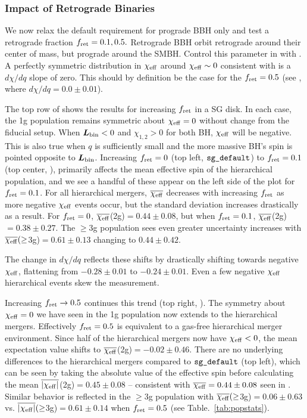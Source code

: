 \subsubsection{Impact of Retrograde Binaries}
\label{sec:retro-results}
We now relax the default requirement for prograde BBH only and test a retrograde fraction $\fret=0.1,0.5.$ Retrograde BBH orbit retrograde around their center of mass, but prograde around the SMBH.
Control this parameter in \mcfacts with .
A perfectly symmetric  distribution in $\Xeff$ around $\Xeff \sim 0$ consistent with is a $d\chi/dq$ slope of zero.
This should by definition be the case for the $\fret=0.5$ (see , where $d\chi/dq=0.0\pm0.01$).

The top row of  shows the results for increasing $\fret$ in a SG disk.
In each case, the 1g population remains symmetric about $\Xeff=0$ without change from the fiducial setup.
When $\vec{L}_{\rm bin}<0$ and $\chi_{1,2}>0$ for both BH, $\Xeff$ will be negative.
This is also true when $q$ is sufficiently small and the more massive BH's spin is pointed opposite to $\vec{L}_{\rm bin}$.
Increasing  $\fret=0$ (top left, $\sgdefault$) to $\fret=0.1$ (top center, ), primarily affects the mean effective spin of the hierarchical population, and we see a handful of these appear on the left side of the plot for $\fret=0.1$.
For all hierarchical mergers, $\barXeff$ decreases with increasing $\fret$ as more negative $\Xeff$ events occur, but the standard deviation increases drastically as a result.
For $\fret=0$, $\barXeff$(2g)$=0.44\pm0.08$, but when $\fret=0.1$, $\barXeff$(2g)$=0.38\pm0.27$.
The $\geq$3g population sees even greater uncertainty increases with $\barXeff(\geq$3g)$=0.61\pm0.13$ changing to $0.44\pm0.42$.

The change in $d\chi/dq$ reflects these shifts by drastically shifting towards negative $\Xeff$, flattening from $-0.28\pm0.01$ to $-0.24\pm0.01$.
Even a few negative $\Xeff$ hierarchical events skew the measurement.

Increasing $\fret \rightarrow 0.5$ continues this trend (top right, ).
The symmetry about $\Xeff=0$ we have seen in the 1g population now extends to the hierarchical mergers.
Effectively $\fret=0.5$ is equivalent to a gas-free hierarchical merger environment.
Since half of the hierarchical mergers now have $\Xeff<0$, the mean expectation value shifts to $\barXeff$(2g)$=-0.02\pm0.46$.
There are no underlying differences to the hierarchical mergers compared to $\sgdefault$ (top left), which can be seen by taking the absolute value of the effective spin before calculating the mean $\overline{|\Xeff|}$(2g)$=0.45\pm0.08$ -- consistent with $\barXeff=0.44\pm0.08$ seen in \sgdefault.
Similar behavior is reflected in the $\geq$3g population with $\barXeff(\geq$3g)$=0.06\pm0.63$ vs.
$\overline{|\Xeff|}(\geq$3g)$=0.61\pm0.14$ when $\fret=0.5$ (see Table.~\ref{tab:popstats}).

